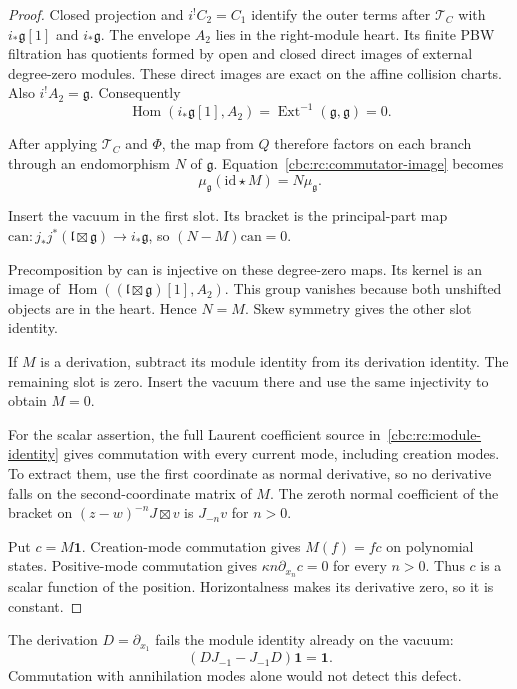 \begin{proof}
Closed projection and $i^!C_2=C_1$ identify
the outer terms after $\mathcal T_C$ with
$i_*\mathfrak g[1]$ and $i_*\mathfrak g$.
The envelope $A_2$ lies in the right-module
heart. Its finite PBW filtration has quotients formed by open and closed
direct images of external degree-zero modules. These direct images
are exact on the affine collision charts.
Also $i^!A_2=\mathfrak g$. Consequently
\[
 \operatorname{Hom}(i_*\mathfrak g[1],A_2)
 =\operatorname{Ext}^{-1}(\mathfrak g,\mathfrak g)=0.
\]

After applying $\mathcal T_C$ and $\Phi$,
the map from $Q$ therefore factors on each
branch through an endomorphism $N$ of
$\mathfrak g$. Equation~\eqref{cbc:rc:commutator-image}
becomes
\[
 \mu_{\mathfrak g}(\mathrm{id}\star M)=N\mu_{\mathfrak g}.
\]

Insert the vacuum in the first slot. Its
bracket is the principal-part map
$\mathrm{can}:j_*j^*(\mathfrak l\boxtimes\mathfrak g)
\to i_*\mathfrak g$, so $(N-M)\mathrm{can}=0$.

Precomposition by $\mathrm{can}$ is injective on these degree-zero
maps. Its kernel is an image of
$\operatorname{Hom}((\mathfrak l\boxtimes\mathfrak g)[1],A_2)$.
This group vanishes because both unshifted objects are in the heart. Hence $N=M$.
Skew symmetry gives the other slot identity.

If $M$ is a derivation, subtract its module
identity from its derivation identity. The
remaining slot is zero. Insert the vacuum
there and use the same injectivity to obtain
$M=0$.

For the scalar assertion, the full Laurent
coefficient source in~\eqref{cbc:rc:module-identity}
gives commutation with every current mode,
including creation modes. To extract them,
use the first coordinate as normal derivative,
so no derivative falls on the second-coordinate
matrix of $M$. The zeroth normal coefficient
of the bracket on $(z-w)^{-n}J\boxtimes v$
is $J_{-n}v$ for $n>0$.

Put $c=M\mathbf1$. Creation-mode commutation
gives $M(f)=fc$ on polynomial states.
Positive-mode commutation gives
$\kappa n\partial_{x_n}c=0$ for every $n>0$.
Thus $c$ is a scalar function of the position.
Horizontalness makes its derivative zero,
so it is constant.
\end{proof}

The derivation $D=\partial_{x_1}$ fails the
module identity already on the vacuum:
\[
 (DJ_{-1}-J_{-1}D)\mathbf1=\mathbf1.
\]
Commutation with annihilation modes alone
would not detect this defect.

